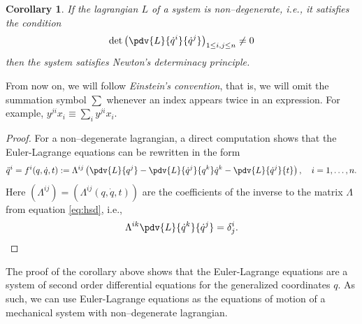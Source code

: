 \documentclass[english,fontsize=11pt,paper=b5]{scrbook}
\numberwithin{equation}{chapter}
\newtheorem{corollary}[theorem]{Corollary}
\theoremstyle{definition}
\newcommand{\emphidx}[1]{\index{#1}\emph{#1}}
\begin{document}
    \begin{corollary}
      If the lagrangian $L$ of a system is \emph{non--degenerate}, i.e., it satisfies the condition
      \begin{equation}
        \det \left(\pdv{L}{\dot q^i}{\dot q^j}
        \right)_{1\leq i,j\leq n} \neq 0
      \end{equation}
      then the system satisfies Newton's determinacy principle.
    \end{corollary}

    \begin{tcolorbox}[title=Einstein's convention]
      From now on, we will follow \emphidx{Einstein's convention}, that is, we will omit the summation symbol $\sum$ whenever an index appears twice in an expression.
      For example, $y^{ji} x_i \equiv \sum_i y^{ji} x_i$.
    \end{tcolorbox}


    \begin{proof}
      For a non--degenerate lagrangian, a direct computation shows that the Euler-Lagrange equations can be rewritten in the form
      \begin{equation}
        \ddot q^i = f^i(q,\dot q, t)
        := \Lambda^{ij}\left(\pdv{L}{q^j} - \pdv{L}{\dot q^j}{q^k} \dot q^k - \pdv{L}{\dot q^j}{t}\right),
        \quad i=1,\ldots,n.
      \end{equation}
      Here $\left(\Lambda^{ij}\right) = \left(\Lambda^{ij}(q, \dot q, t)\right)$ are the coefficients of the inverse to the matrix $\Lambda$ from equation \eqref{eq:hsd}, i.e.,
      \begin{equation}
      \Lambda^{ik} \pdv{L}{\dot q^k}{\dot q^j} = \delta^{i}_{j}.
      \end{equation}
    \end{proof}

    The proof of the corollary above shows that the Euler-Lagrange equations are a system of second order differential equations for the generalized coordinates $q$.
    As such, we can use Euler-Lagrange equations as the equations of motion of a mechanical system with non--degenerate lagrangian.
\end{document}
